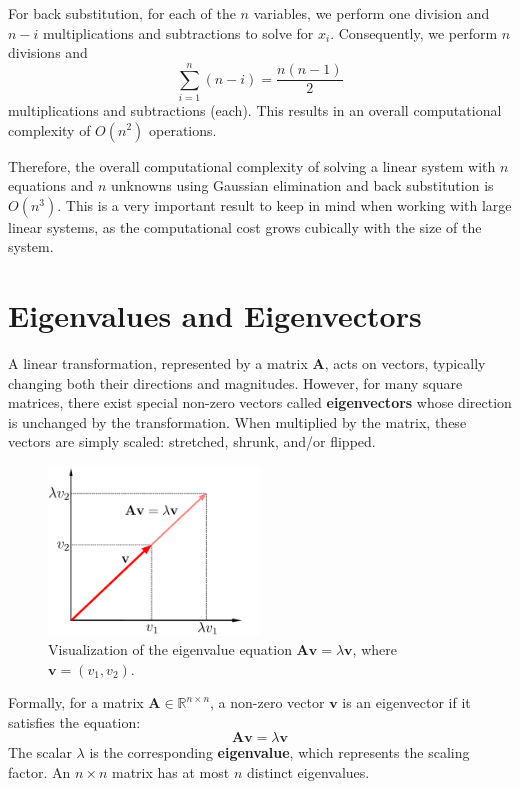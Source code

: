 For back substitution, for each of the $n$ variables, we perform one division and $n - i$ multiplications and subtractions to solve for $x_i$. Consequently, we perform $n$ divisions and
\begin{equation*}
    \sum_{i=1}^{n} (n - i) = \frac{n(n - 1)}{2}
\end{equation*}
multiplications and subtractions (each). This results in an overall computational complexity of $ O(n^2) $ operations.

Therefore, the overall computational complexity of solving a linear system with $n$ equations and $n$ unknowns using Gaussian elimination and back substitution is $ O(n^3) $. This is a very important result to keep in mind when working with large linear systems, as the computational cost grows cubically with the size of the system.


\section{Eigenvalues and Eigenvectors}
A linear transformation, represented by a matrix $\mathbf{A}$, acts on vectors, typically changing both their directions and magnitudes.
However, for many square matrices, there exist special non-zero vectors called \textbf{eigenvectors} whose direction is unchanged by the transformation. When multiplied by the matrix, these vectors are simply scaled: stretched, shrunk, and/or flipped.

\begin{figure}[H]
    \centering
    \includegraphics[width=0.5\textwidth]{figs/linear-algebra/eigenvalue_equation.pdf}
    \caption{Visualization of the eigenvalue equation $ \mathbf{A}\mathbf{v} = \lambda \mathbf{v} $, where $\mathbf{v} = (v_1, v_2)$.}
    \label{fig:eigenvalue-equation}
\end{figure}

Formally, for a matrix $\mathbf{A} \in \mathbb{R}^{n\times n}$, a non-zero vector $\mathbf{v}$ is an eigenvector if it satisfies the equation:
$$ \mathbf{A}\mathbf{v} = \lambda \mathbf{v} $$
The scalar $\lambda$ is the corresponding \textbf{eigenvalue}, which represents the scaling factor. An $n \times n$ matrix has at most $n$ distinct eigenvalues.


